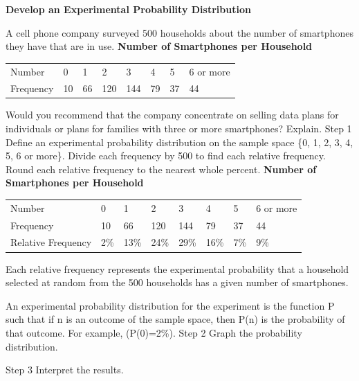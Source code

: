 \documentclass{article}
\newenvironment{example}[1]{}{}         %
\newcommand{\answer}[1]{}               %
\newcommand{\placeholder}[2]{}          %
\newcommand{\te}[1]{}                   %
\begin{document}
\begin{example}{2}
\textbf{Develop an Experimental Probability Distribution}
\te{APPLICATION}
A cell phone company surveyed 500 households about the number of smartphones they have that are in use.
\textbf{Number of Smartphones per Household}
\begin{tabular}{llllllll}
Number & 0 & 1 & 2 & 3 & 4 & 5 & 6 or more \\
Frequency & 10 & 66 & 120 & 144 & 79 & 37 & 44 \\
\end{tabular}
Would you recommend that the company concentrate on selling data plans for individuals or plans for families with three or more smartphones? Explain.
Step 1 Define an experimental probability distribution on the sample space \{0, 1, 2, 3, 4, 5, 6 or more\}.
Divide each frequency by 500 to find each relative frequency. Round each relative frequency to the nearest whole percent.
\textbf{Number of Smartphones per Household}
\begin{tabular}{llllllll}
Number & 0 & 1 & 2 & 3 & 4 & 5 & 6 or more \\
Frequency & 10 & 66 & 120 & 144 & 79 & 37 & 44 \\
Relative Frequency & 2\% & 13\% & 24\% & 29\% & 16\% & 7\% & 9\% \\
\end{tabular}
Each relative frequency represents the experimental probability that a household selected at random from the 500 households has a given number of smartphones.
\te{An experimental probability is based upon collecting real-world data and finding relative frequencies.}
An experimental probability distribution for the experiment is the function P such that if n is an outcome of the sample space, then P(n) is the probability of that outcome. For example, (P(0)=2\%).
Step 2 Graph the probability distribution.
\placeholder{graph}{Orange separated bars on pale grid. Horizontal Number of Smartphones categories 0,1,2,3,4,5,6 or more; vertical Probability 0 to 35 percent in 5-percent increments. Bar heights 2,13,24,29,16,7,9 percent, respectively. No arrowheads.}
\te{COMMON ERROR When graphing a probability distribution, the heights of the bars represent the probabilities of each outcome, not their frequencies.}
Step 3 Interpret the results.
\answer{The probability that a household has 3 or more cell phones is 61\%. Therefore, the company should focus on family plans rather than on individual plans.}
\end{example}
\end{document}
